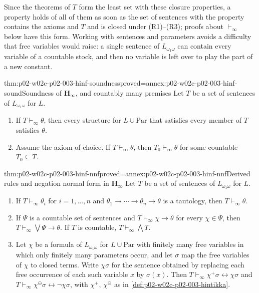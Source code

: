 Since the theorems of \(T\) form the least set with these closure
properties, a property holds of all of them as soon as the set of
sentences with the property contains the axioms and \(T\) and is closed
under (R1)--(R3); proofs about \(\vdash_{\infty}\) below have this form.
Working with sentences and parameters avoids a difficulty that free
variables would raise: a single sentence of \(L_{\omega_1\omega}\) can
contain every variable of a countable stock, and then no variable is left
over to play the part of a new constant.

\begin{hblemma}{thm:p02-w02c-p02-003-hinf-soundness}{proved=annex:p02-w02c-p02-003-hinf-sound}{Soundness of \(\mathbf H_{\infty}\), and countably many premises}
Let \(T\) be a set of sentences of \(L_{\omega_1\omega}\) for \(L\).
\begin{enumerate}
\item If \(T\vdash_{\infty}\theta\), then every structure for
      \(L\cup\mathrm{Par}\) that satisfies every member of \(T\) satisfies
      \(\theta\).
\item Assume the axiom of choice.  If \(T\vdash_{\infty}\theta\), then
      \(T_0\vdash_{\infty}\theta\) for some countable \(T_0\subseteq T\).
\end{enumerate}
\end{hblemma}

\begin{hblemma}{thm:p02-w02c-p02-003-hinf-nnf}{proved=annex:p02-w02c-p02-003-hinf-nnf}{Derived rules and negation normal form in \(\mathbf H_{\infty}\)}
Let \(T\) be a set of sentences of \(L_{\omega_1\omega}\) for \(L\).
\begin{enumerate}
\item If \(T\vdash_{\infty}\theta_i\) for \(i=1,\ldots,n\) and
      \(\theta_1\to\cdots\to\theta_n\to\theta\) is a tautology, then
      \(T\vdash_{\infty}\theta\).
\item If \(\Psi\) is a countable set of sentences and
      \(T\vdash_{\infty}\chi\to\theta\) for every \(\chi\in\Psi\), then
      \(T\vdash_{\infty}\bigvee\Psi\to\theta\).  If \(T\) is countable,
      \(T\vdash_{\infty}\bigwedge T\).
\item Let \(\chi\) be a formula of \(L_{\omega_1\omega}\) for
      \(L\cup\mathrm{Par}\) with finitely many free variables in which only
      finitely many parameters occur, and let \(\sigma\) map the free
      variables of \(\chi\) to closed terms.  Write \(\chi\sigma\) for the
      sentence obtained by replacing each free occurrence of each such
      variable \(x\) by \(\sigma(x)\).  Then
      \(T\vdash_{\infty}\chi^{+}\sigma\leftrightarrow\chi\sigma\) and
      \(T\vdash_{\infty}\chi^{\ominus}\sigma\leftrightarrow\neg\chi\sigma\),
      with \(\chi^{+}\), \(\chi^{\ominus}\) as in
      \cref{def:p02-w02c-p02-003-hintikka}.
\end{enumerate}
\end{hblemma}

